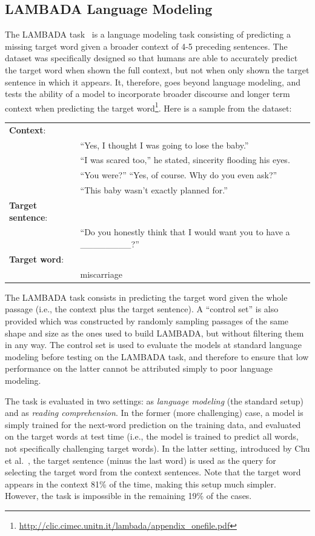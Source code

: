 \subsection{LAMBADA Language Modeling}
The LAMBADA task~\citep{paperno2016lambada} is a language modeling task consisting of predicting a missing target word given a broader context of 4-5 preceding sentences. The dataset was specifically designed so that humans are able to accurately predict the target word when shown the full context, but not when only shown the target sentence in which it appears. It, therefore, goes beyond language modeling, and tests the ability of a model to incorporate broader discourse and longer term context when predicting the target word\footnote{\url{http://clic.cimec.unitn.it/lambada/appendix_onefile.pdf}}.
Here is a sample from the dataset:

\begin{table}[h!]
\fontsize{8}{10}\selectfont
\begin{tabular}{l l}
\textbf{Context}: & \\
& ``Yes, I thought I was going to lose the baby.'' \\
&  ``I was scared too,'' he stated, sincerity flooding his eyes. \\ 
&  ``You were?'' ``Yes, of course. Why do you even ask?''  \\
&  ``This baby wasn't exactly planned for.''
\\
\textbf{Target sentence}: & \\
& ``Do you honestly think that I would want you to have a \_\_\_\_\_\_\_\_?'' 
\\
\textbf{Target word}:  & \\  
& miscarriage
\end{tabular}
\end{table}

The LAMBADA task consists in predicting the target word given the whole passage (i.e., the context plus the target sentence). A ``control set''  is also provided which was constructed by randomly sampling passages of the same shape and size as the ones used to build LAMBADA, but without filtering them in any way. The control set is used to evaluate the models at standard language modeling before testing on the LAMBADA task, and therefore to ensure that low performance on the latter cannot be attributed simply to poor language modeling.

The task is evaluated in two settings: as \emph{language modeling} (the standard setup) and as \emph{reading comprehension}. In the former (more challenging) case, a model is simply trained for the next-word prediction on the training data, and evaluated on the target words at test time (i.e., the model is trained to predict all words, not specifically challenging target words).  In the latter setting, introduced by Chu et al.~\cite{chu2017broad}, the target sentence (minus the last word) is used as the query for selecting the target word from the context sentences. Note that the target word appears in the context 81\% of the time, making this setup much simpler. However, the task is impossible in the remaining 19\% of the cases.

